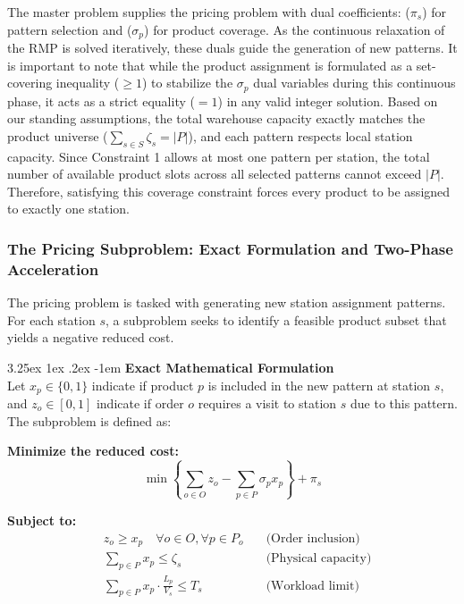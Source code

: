 \documentclass[preprint,review,11pt,authoryear]{elsarticle}
\makeatletter
\renewcommand\paragraph{\@startsection{paragraph}{4}{\z@}
  {3.25ex \@plus1ex \@minus.2ex}
  {-1em}
  {\normalfont\normalsize\itshape}}
\makeatother
\begin{document}
The master problem supplies the pricing problem with dual coefficients: ($\pi_s$) for pattern selection and ($\sigma_p$) for product coverage. As the continuous relaxation of the RMP is solved iteratively, these duals guide the generation of new patterns. It is important to note that while the product assignment is formulated as a set-covering inequality ($\geq 1$) to stabilize the $\sigma_p$ dual variables during this continuous phase, it acts as a strict equality ($= 1$) in any valid integer solution. Based on our standing assumptions, the total warehouse capacity exactly matches the product universe ($\sum_{s \in S} \zeta_s = |P|$), and each pattern respects local station capacity. Since Constraint 1 allows at most one pattern per station, the total number of available product slots across all selected patterns cannot exceed $|P|$. Therefore, satisfying this coverage constraint forces every product to be assigned to exactly one station.


\subsubsection{The Pricing Subproblem: Exact Formulation and Two-Phase Acceleration}

The pricing problem is tasked with generating new station assignment patterns. For each station $s$, a subproblem seeks to identify a feasible product subset that yields a negative reduced cost. 

\paragraph{\textbf{Exact Mathematical Formulation \\}}
\noindent Let $x_p \in \{0,1\}$ indicate if product $p$ is included in the new pattern at station $s$, and $z_o \in [0,1]$ indicate if order $o$ requires a visit to station $s$ due to this pattern. The subproblem is defined as:

\textbf{Minimize the reduced cost:}
\[
\min \left\{ \sum_{o \in O} z_o - \sum_{p \in P} \sigma_{p} x_p \right\} + \pi_s
\]

\textbf{Subject to:}
\begin{align}
    & z_o \geq x_p \quad \forall o \in O, \forall p \in P_o \quad &\text{(Order inclusion)} \\
    & \sum_{p \in P} x_p \leq \zeta_s \quad &\text{(Physical capacity)} \\
    & \sum_{p \in P} x_p \cdot \frac{L_p}{V_s} \leq T_s \quad &\text{(Workload limit)} 
\end{align}
\end{document}
